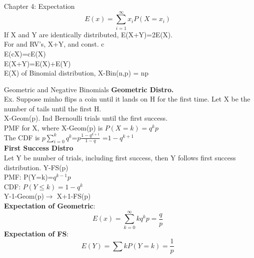 \documentclass[a4paper, 12pt]{article}
\begin{document}
\begin{section}{Chapter 4: Expectation}
\begin{equation} 
E(x)=\sum_{i=1}^{\infty}x_{i}P(X=x_{i})
\end{equation}
If X and Y are identically distributed, E(X+Y)=2E(X).\\
For and RV's, X+Y, and const. c \\
\indent E(cX)=cE(X)\\
\indent	E(X+Y)=E(X)+E(Y)\\
E(X) of Binomial distribution, X-Bin(n,p) = np
\begin{subsection}{Geometric and Negative Binomials}
\textbf{Geometric Distro.}\\
Ex. Suppose minho flips a coin until it lands on H for the first time. Let X be the number of tails until the first H.\\
\indent X-Geom(p). Ind Bernoulli trials until the first success.\\
PMF for X, where X-Geom(p) is $P(X=k)=q^{k}p$\\
The CDF is $p\sum_{i=0}^{k}q^{k}$=$p\frac{1-q^{k+1}}{1-q}$
=$1-q^{k+1}$\\
\textbf{First Success Distro}\\
Let Y be number of trials, including first success, then Y
follows first success distribution. Y-FS(p)\\
PMF: P(Y=k)=$q^{k-1}p$\\
CDF: $P(Y\leq k)=1-q^{k}$\\
Y-1-Geom(p)$\to$ X+1-FS(p)\\
\textbf{Expectation of Geometric}:
\begin{equation} 
E(x)=\sum_{k=0}^{\infty}kq^{k}p=\frac{q}{p}
\end{equation}
\textbf{Expectation of FS}:
\begin{equation} 
E(Y)=\sum k P(Y=k)=\frac{1}{p}
\end{equation}


\end{subsection}
\end{section}
\end{document}
